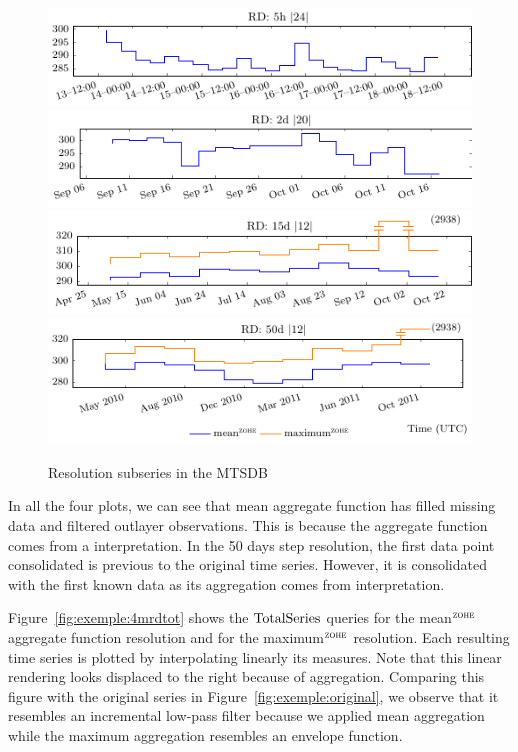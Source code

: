 \begin{figure}[tp]
  \centering
  \includegraphics{fig_exemple_4mrd1.pdf}
  \includegraphics{fig_exemple_4mrd2.pdf}
  \includegraphics{fig_exemple_4mrd3.pdf}
  \includegraphics{fig_exemple_4mrd4.pdf}
  \caption{Resolution subseries in the MTSDB}
  \label{fig:exemple:4mrd}
\end{figure}

In all the four plots, we can see that mean aggregate function has
filled missing data and filtered outlayer observations. This is
because the aggregate function comes from a \zohe{} interpretation.
In the 50 days step resolution, the first data point consolidated is
previous to the original time series. However, it is consolidated with
the first known data as its aggregation comes from \zohe{}
interpretation.

Figure~\ref{fig:exemple:4mrdtot} shows the $\operatorname{TotalSeries}$ queries for
the mean$^{\zohe}$ aggregate function resolution and for the
maximum$^{\zohe}$ resolution.  Each resulting time series is plotted
by interpolating linearly its measures. Note that this linear
rendering looks displaced to the right because of \zohe{} aggregation.
Comparing this figure with the original series in
Figure~\ref{fig:exemple:original}, we observe that it resembles an
incremental low-pass filter because we applied mean aggregation while
the maximum aggregation resembles an envelope function.

